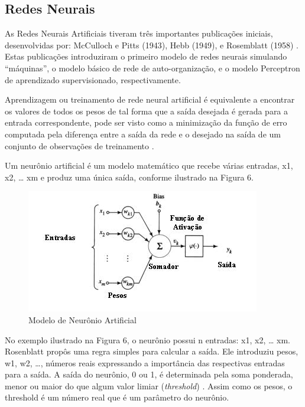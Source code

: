 \documentclass[conference]{IEEEtran}
\begin{document}
	
	\subsection{Redes Neurais}

As Redes Neurais Artificiais tiveram três importantes publicações iniciais, desenvolvidas por: McCulloch e Pitts (1943), Hebb (1949), e Rosemblatt (1958) \cite{perceptron}. Estas publicações introduziram o primeiro modelo de redes neurais simulando “máquinas”, o modelo básico de rede de auto-organização, e o modelo Perceptron de aprendizado supervisionado, respectivamente.
		
    Aprendizagem ou treinamento de rede neural artificial é equivalente a encontrar os valores de todos os pesos de tal forma que a saída desejada é gerada para a entrada correspondente, pode ser visto como a minimização da função de erro computada pela diferença entre a saída da rede e o desejado na saída de um conjunto de observações de treinamento \cite{redes_neurais_apredizagem}.
	
	Um neurônio artificial é um modelo matemático que recebe várias entradas, x1, x2, … xm e produz uma única saída, conforme ilustrado na Figura 6.
	
	\begin{figure}[htbp]
	\centerline{\includegraphics[scale=.7]{imagens/neuronio_artificial.jpg}}
	\caption{Modelo de Neurônio Artificial}
	\label{fig}
	\end{figure}
	
	No exemplo ilustrado na Figura 6, o neurônio possui n entradas: x1, x2, … xm. Rosenblatt propôs uma regra simples para calcular a saída. Ele introduziu pesos, w1, w2, …, números reais expressando a importância das respectivas entradas para a saída. A saída do neurônio, 0 ou 1, é determinada pela soma ponderada, menor ou maior do que algum valor limiar (\textit{threshold}) \cite{reuronio}. Assim como os pesos, o threshold é um número real que é um parâmetro do neurônio. 
\end{document}
